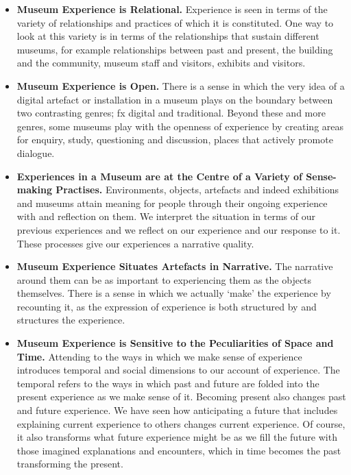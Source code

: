 \begin{itemize}
    \item \textbf{Museum Experience is Relational.} Experience is seen in terms of the variety of relationships and practices of which it is constituted. One way to look at this variety is in terms of the relationships that sustain different museums, for example relationships between past and present, the building and the community, museum staff and visitors, exhibits and visitors. 
    
    \item \textbf{Museum Experience is Open.} There is a sense in which the very idea of a digital artefact or installation in a museum plays on the boundary between two contrasting genres; fx digital and traditional. Beyond these and more genres, some museums play with the openness of experience by creating areas for enquiry, study, questioning and discussion, places that actively promote dialogue.

    \item \textbf{Experiences in a Museum are at the Centre of a Variety of Sense-making Practises.} Environments, objects, artefacts and indeed exhibitions and museums attain meaning for people through their ongoing experience with and reflection on them. We interpret the situation in terms of our previous experiences and we reflect on our experience and our response to it. These processes give our experiences a narrative quality.
    
    \item \textbf{Museum Experience Situates Artefacts in Narrative.} The narrative around them can be as important to experiencing them as the objects themselves. There is a sense in which we actually ‘make’ the experience by recounting it, as the expression of experience is both structured by and structures the experience. 
    
    \item \textbf{Museum Experience is Sensitive to the Peculiarities of Space and Time.} Attending to the ways in which we make sense of experience introduces temporal and social dimensions to our account of experience. The temporal refers to the ways in which past and future are folded into the present experience as we make sense of it. Becoming present also changes past and future experience. We have seen how anticipating a future that includes explaining current experience to others changes current experience. Of course, it also transforms what future experience might be as we fill the future with those imagined explanations and encounters, which in time becomes the past transforming the present. 
    
\end{itemize}


